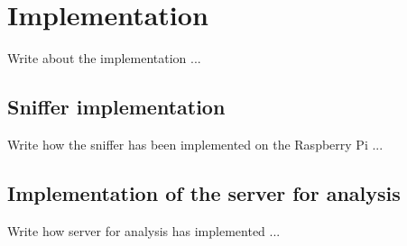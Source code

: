 \chapter{Implementation}
\label{cha:implementation}
\vspace{0.5 cm} 

Write about the implementation ...


\vspace{0.5 cm} 
\section{Sniffer implementation}
\label{sec:sniffer}
\vspace{0.5 cm} 

Write how the sniffer has been implemented on the Raspberry Pi ...


\vspace{0.5 cm} 
\section{Implementation of the server for analysis}
\label{sec:implser}
\vspace{0.5 cm} 

Write how server for analysis has implemented ...
